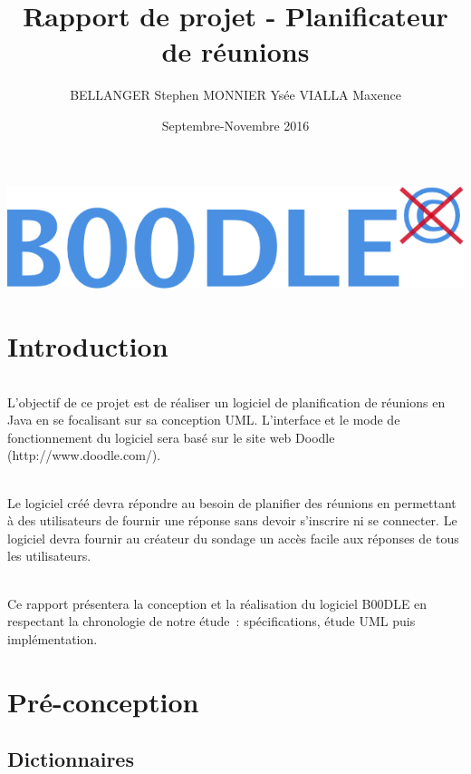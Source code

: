 \documentclass[]{report}
\title{Rapport de projet - Planificateur de réunions}
\author{BELLANGER Stephen
		MONNIER Ysée
		VIALLA Maxence}
\date{Septembre-Novembre 2016}
\begin{document}
\begin{titlepage}
	
	\includegraphics[scale=0.5]{figures/Logo_B00DLE.png}
	\maketitle
\end{titlepage}
\part{Introduction}

\paragraph{}
	L'objectif de ce projet est de réaliser un logiciel de planification de réunions en Java en se focalisant sur sa conception UML. L'interface et le mode de fonctionnement du logiciel sera basé sur le site web Doodle (http://www.doodle.com/). 
	\paragraph{}
	Le logiciel créé devra répondre au besoin de planifier des réunions en permettant à des utilisateurs de fournir une réponse sans devoir s'inscrire ni se connecter. Le logiciel devra fournir au créateur du sondage un accès facile aux réponses de tous les utilisateurs.
	\paragraph{}
	Ce rapport présentera la conception et la réalisation du logiciel B00DLE en respectant la chronologie de notre étude : spécifications, étude UML puis implémentation.



\part{Pré-conception}

\chapter{Dictionnaires}
\end{document}
